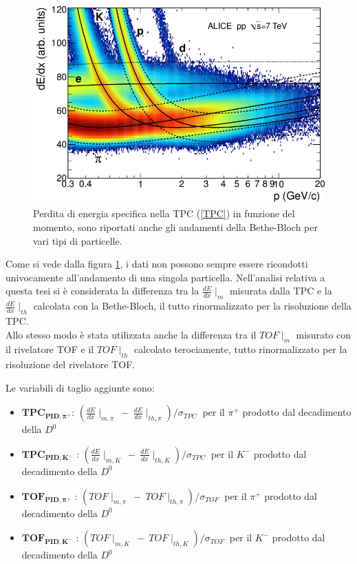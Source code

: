     \begin{figure}[htbp]
        \centering
        \includegraphics[width=0.6\linewidth]{training&testing/Specific-energy-loss-in-the-TPC.png}
        \caption{ Perdita di energia specifica nella TPC (\ref{TPC}) in funzione del momento, sono riportati anche gli andamenti della Bethe-Bloch per vari tipi di particelle.}
        \label{fig:BBnellaTPC}
    \end{figure}
    
    Come si vede dalla figura \ref{fig:BBnellaTPC}, i dati non possono sempre essere ricondotti univocamente all'andamento di una singola particella. Nell'analisi relativa a questa tesi si è considerata la differenza tra la $\frac{dE}{dx}\mid_m$ misurata dalla TPC e la $\frac{dE}{dx}\mid_{th}$ calcolata con la Bethe-Bloch, il tutto rinormalizzato per la risoluzione della TPC. 
    \\Allo stesso modo è stata utilizzata anche la differenza tra il $TOF\mid_{m}$ misurato con il rivelatore TOF e il $TOF\mid_{th}$ calcolato terociamente, tutto rinormalizzato per la risoluzione del rivelatore TOF.
    
    Le variabili di taglio aggiunte sono:
    \begin{itemize}
        \item $\bm{TPC_{PID,\pi^+}}$: $(\frac{dE}{dx}\mid_{m, \pi} \ - \ \frac{dE}{dx}\mid_{th, \pi} ) / \sigma_{TPC} \ $ per il $\pi^+$ prodotto dal decadimento della $D^0$ %
        \item $\bm{TPC_{PID,K^-}}$ :  $(\frac{dE}{dx}\mid_{m,K} \ - \ \frac{dE}{dx}\mid_{th,K} ) / \sigma_{TPC} \ $ per il $K^-$ prodotto dal decadimento della $D^0$ %
        \item $\bm{TOF_{PID,\pi^+}}$ : $ (TOF\mid_{m,\pi} \ - \ TOF\mid_{th,\pi}) / \sigma_{TOF} \ $ per il $\pi^+$ prodotto dal decadimento della $D^0$ %
        \item $\bm{TOF_{PID,K^-}}$ : $ (TOF\mid_{m,K} \ - \ TOF\mid_{th,K}) / \sigma_{TOF} \ $ per il $K^-$ prodotto dal decadimento della $D^0$ %
    \end{itemize}{}
    
